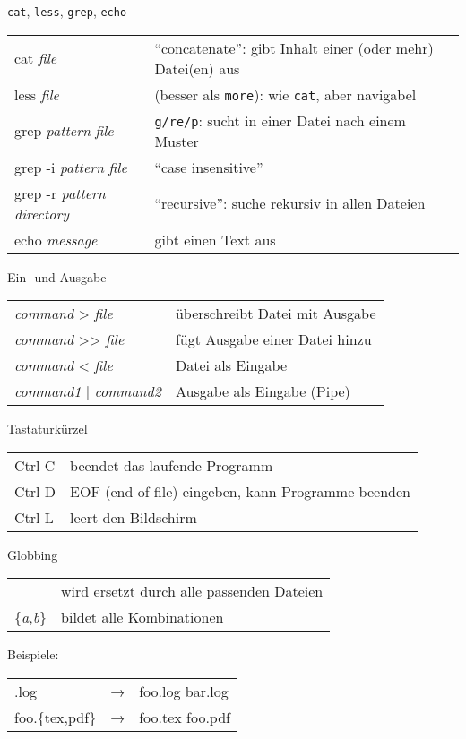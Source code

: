 \begin{frame}{\texttt{cat}, \texttt{less}, \texttt{grep}, \texttt{echo}}
  \begin{tabu}{>{\ttfamily}l X[,L]}
    cat \textit{file}                           & \enquote{concatenate}: gibt Inhalt einer (oder mehr) Datei(en) aus \\
    less \textit{file}                          & (besser als \texttt{more}): wie \texttt{cat}, aber navigabel \\
    grep \textit{pattern} \textit{file}         & \texttt{g/re/p}: sucht in einer Datei nach einem Muster \\
    grep -i \textit{pattern} \textit{file}      & \enquote{case insensitive} \\
    grep -r \textit{pattern} \textit{directory} & \enquote{recursive}: suche rekursiv in allen Dateien \\
    echo \textit{message}                       & gibt einen Text aus
  \end{tabu}
\end{frame}

\begin{frame}{Ein- und Ausgabe}
  \begin{tabu}{>{\ttfamily}l X[,L]}
    \textit{command} > \textit{file}      & überschreibt Datei mit Ausgabe \\
    \textit{command} >> \textit{file}     & fügt Ausgabe einer Datei hinzu \\
    \textit{command} < \textit{file}      & Datei als Eingabe \\
    \textit{command1} | \textit{command2} & Ausgabe als Eingabe (Pipe)
  \end{tabu}
\end{frame}

\begin{frame}{Tastaturkürzel}
  \begin{tabu}{>{\ttfamily}l X[,L]}
    Ctrl-C & beendet das laufende Programm \\
    Ctrl-D & EOF (end of file) eingeben, kann Programme beenden \\
    Ctrl-L & leert den Bildschirm
  \end{tabu}
\end{frame}

\begin{frame}{Globbing}
  \begin{tabu}{>{\ttfamily}l X[,L]}
    *                         & wird ersetzt durch alle passenden Dateien \\
    \{\textit{a},\textit{b}\} & bildet alle Kombinationen
  \end{tabu}

  \vspace{2cm}
  Beispiele:\\[10pt]
  \begin{tabu}{>{\ttfamily}l c >{\ttfamily}l}
    *.log           & → & foo.log bar.log \\
    foo.\{tex,pdf\} & → & foo.tex foo.pdf
  \end{tabu}
\end{frame}

